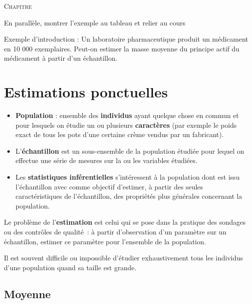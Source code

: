 \documentclass[11pt,a4paper]{article}
\begin{document}
\begin{center}
{\large\textsc{Chapitre}}\\[2pt]
{\color{blue}\Huge{}}
\end{center}
\bigskip

{\color{blue} En parallèle, montrer l'exemple au tableau et relier au cours

    Exemple d'introduction : Un laboratoire pharmaceutique produit un médicament en 10 000 exemplaires. Peut-on estimer la masse moyenne du principe actif du médicament à partir d'un échantillon.
    }
\section{Estimations ponctuelles}

\begin{definition}
\begin{itemize}
\item \textbf{Population} : ensemble des \textbf{individus} ayant quelque chose en commun et pour lesquels on étudie un ou plusieurs \textbf{caractères} (par exemple le poids exact de tous les pots d'une certaine crème vendus par un fabricant).
\item L'\textbf{échantillon} est un sous-ensemble de la population étudiée pour lequel on effectue une série de mesures sur la ou les variables étudiées.
\item Les \textbf{statistiques inférentielles} s'intéressent à la population dont est issu l'échantillon avec comme objectif d'estimer, à partir des seules caractéristiques de l'échantillon, des propriétés plus générales concernant la population.
\end{itemize}
\end{definition}

Le problème de l'\textbf{estimation} est celui qui se pose dans la pratique des sondages ou des contrôles de qualité~: à partir d'observation d'un paramètre sur un échantillon, estimer ce paramètre pour l'ensemble de la population.

\begin{remarque}
Il est souvent difficile ou impossible d'étudier exhaustivement tous les individus d'une population quand sa taille est grande.
\end{remarque}

\subsection{Moyenne}
\end{document}
